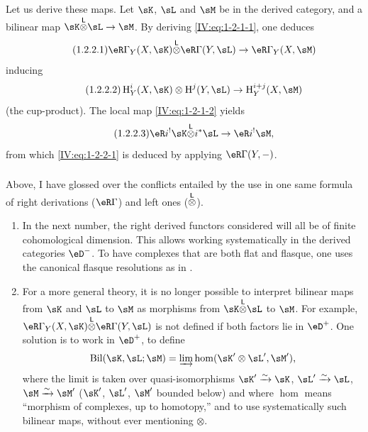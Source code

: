 \subsubsection{}\label{IV:1-2-2}

Let us derive these maps. Let $\sK$, $\sL$ and $\sM$ be in the derived
category, and a bilinear map $\sK\lotimes\sL\to\sM$. By
deriving \eqref{IV:eq:1-2-1-1}, one deduces
\begin{equation*}\tag{1.2.2.1}\label{IV:eq:1-2-2-1}
  \eR\Gamma_Y(X,\sK) \lotimes \eR\Gamma(Y,\sL) \to \eR\Gamma_Y(X,\sM)
\end{equation*}
inducing
\begin{equation*}\tag{1.2.2.2}\label{IV:eq:1-2-2-2}
  \h_Y^i(X,\sK)\otimes \h^j(Y,\sL) \to \h_Y^{i+j}(X,\sM)
\end{equation*}
(the cup-product). The local map \eqref{IV:eq:1-2-1-2} yields
\begin{equation*}\tag{1.2.2.3}\label{IV:eq:1-2-2-3}
  \eR i^! \sK\lotimes i^*\sL \to \eR i^!\sM \text{,}
\end{equation*}
from which \eqref{IV:eq:1-2-2-1} is deduced by applying $\eR\Gamma(Y,-)$.




\subsubsection{}\label{IV:1-2-3}

Above, I have glossed over the conflicts entailed by the use in one
same formula of right derivations ($\eR\Gamma$) and left ones
(${\overset{\mathsf{L}}{\otimes}}$).
\begin{enumerate}[\indent a)]
  \item In the next number, the right derived functors considered will all
    be of finite cohomological dimension. This allows working
    systematically in the derived categories $\eD^-$. To have
    complexes that are both flat and flasque, one uses the canonical
    flasque resolutions as in \cite[XVII]{sga4}.
  \item For a more general theory, it is no longer possible to interpret
    bilinear maps from $\sK$ and $\sL$ to $\sM$ as
    morphisms from $\sK\lotimes\sL$ to $\sM$. For example,
    $\eR\Gamma_Y(X,\sK)\lotimes\eR\Gamma(Y,\sL)$ is not defined if both
    factors lie in $\eD^+$. One solution is to work in $\eD^+$, to
    define
    \[
      \operatorname{Bil}(\sK,\sL;\sM) = \varinjlim \hom(\sK'\otimes\sL',\sM') \text{,}
    \]
    where the limit is taken over quasi-isomorphisms $\sK'\iso \sK$,
    $\sL'\iso \sL$, $\sM\iso \sM'$ ($\sK'$, $\sL'$, $\sM'$ bounded
    below) and where $\hom$ means ``morphism of complexes, up
    to homotopy,'' and to use systematically such bilinear
    maps, without ever mentioning $\otimes$.
\end{enumerate}




